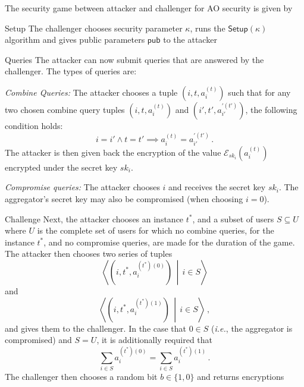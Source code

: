 \documentclass[10pt,letterpaper,oneside,twocolumn,journal]{IEEEtran}
\theoremstyle{definition}
\theoremstyle{definition}
\theoremstyle{remark}
\begin{document}
The security game between attacker and challenger for AO security is given by
\begin{LaTeXdescription}
    \item[Setup] The challenger chooses security parameter $\kappa$, runs the $\mathsf{Setup}(\kappa)$ algorithm and gives public parameters $\mathsf{pub}$ to the attacker
    \item[Queries] The attacker can now submit queries that are answered by the challenger. The types of queries are:
    \begin{LaTeXenumerate}
        \item \textit{Combine Queries:} The attacker chooses a tuple $(i,t,a^{(t)}_i)$ such that for any two chosen combine query tuples $(i,t,a^{(t)}_i)$ and $(i',t',a^{\prime(t')}_{i'})$, the following condition holds:
        \begin{equation*}
            i = i' \wedge t = t' \implies a^{(t)}_{i} = a^{\prime(t')}_{i'}\,.
        \end{equation*}
        The attacker is then given back the encryption of the value $\mathcal{E}_{sk_i}(a^{(t)}_i)$ encrypted under the secret key $sk_i$.
        \item \textit{Compromise queries:} The attacker chooses $i$ and receives the secret key $sk_i$. The aggregator's secret key may also be compromised (when choosing $i=0$).
    \end{LaTeXenumerate} 
    \item[Challenge] Next, the attacker chooses an instance $t^*$, and a subset of users $S \subseteq U$ where $U$ is the complete set of users for which no combine queries, for the instance $t^*$, and no compromise queries, are made for the duration of the game. The attacker then chooses two series of tuples
    \begin{equation*}
        \left\langle(i,t^*,a^{(t^*)(0)}_i)\,\middle|\,i \in S\right\rangle
    \end{equation*}
    and
    \begin{equation*}
        \left\langle(i,t^*,a^{(t^*)(1)}_i)\,\middle|\, i \in S\right\rangle\,,
    \end{equation*}
    and gives them to the challenger. In the case that $0 \in S$ (\textit{i.e.}, the aggregator is compromised) and $S = U$, it is additionally required that
    \begin{equation*}
        \sum_{i\in S} a^{(t^*)(0)}_i = \sum_{i \in S} a^{(t^*)(1)}_i\,.
    \end{equation*}
    The challenger then chooses a random bit $b \in \{1,0\}$ and returns encryptions 

\end{LaTeXdescription}
\end{document}
